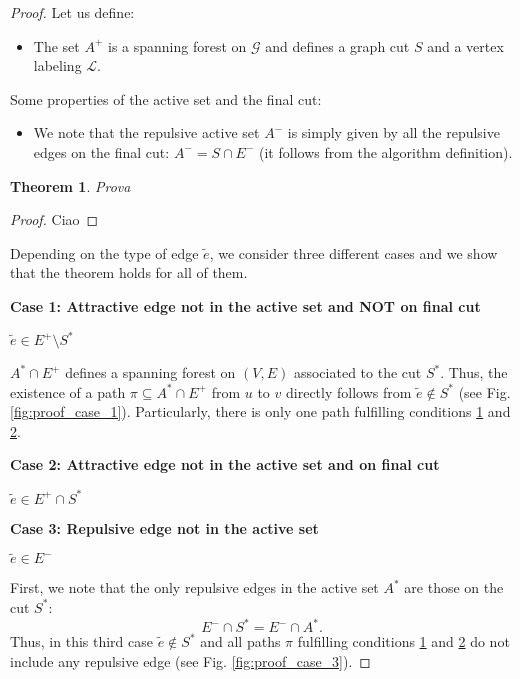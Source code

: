 \documentclass[12pt]{article}
\newcommand\TODO[1]{\fbox{\textcolor{red}{TODO: #1}}}
\newtheorem{theorem}{Theorem}[section]
\begin{document}
\begin{proof}



Let us define:
\begin{itemize}
\item The set $A^{+}$ is a spanning forest on $\mathcal{G}$ and defines a graph cut $S$ and a vertex labeling $\mathcal{L}$.
\end{itemize}

Some properties of the active set and the final cut:
\begin{itemize}
    \item We note that the repulsive active set $A^{-}$ is simply given by all the repulsive edges on the final cut: $A^{-} = S \cap E^{-}$ (it follows from the algorithm definition).
\end{itemize}

\begin{theorem}
Prova
\end{theorem}
\begin{proof}
Ciao
\end{proof}


\TODO{I could also use $\underset{(V,A^{*})}{u\thicksim v}$}

Depending on the type of edge $\tilde{e}$, we consider three different cases and we show that the theorem holds for all of them.

\noindent \textbf{Case 1: Attractive edge not in the active set and NOT on final cut} 

$\tilde{e} \in E^+ \setminus S^* $

 $A^* \cap E^+$ defines a spanning forest on $(V,E)$ associated to the cut $S^*$. Thus, the existence of a path $\pi \subseteq A^* \cap E^+$ from $u$ to $v$ directly follows from $\tilde{e} \notin S^* $ (see Fig. \ref{fig:proof_case_1}). Particularly, there is only one path fulfilling conditions \hyperref[cond_1]{1} and \hyperref[cond_2]{2}.  

\noindent \textbf{Case 2: Attractive edge not in the active set and on final cut}  

$\tilde{e} \in E^+ \cap S^* $


\noindent \textbf{Case 3: Repulsive edge not in the active set} 

$\tilde{e} \in E^-$


First, we note that the only repulsive edges in the active set $A^*$ are those on the cut $S^*$:
\begin{equation}
E^- \cap S^* = E^- \cap A^*.
\end{equation}
 Thus, in this third case $\tilde{e} \notin S^*$ and all paths $\pi$ \TODO{introduce a new notation..?} fulfilling conditions \hyperref[cond_1]{1} and \hyperref[cond_2]{2} do not include any repulsive edge (see Fig. \ref{fig:proof_case_3}). 
\end{proof}
\end{document}
